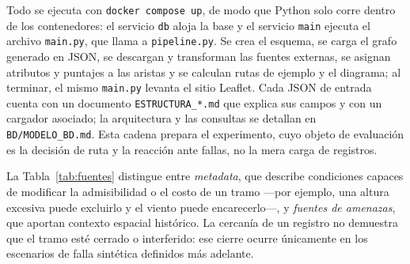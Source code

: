 \documentclass[journal,10pt]{IEEEtran}
\begin{document}
Todo se ejecuta con \texttt{docker compose up}, de modo que Python solo
corre dentro de los contenedores: el servicio \texttt{db} aloja la base y
el servicio \texttt{main} ejecuta el archivo \texttt{main.py}, que llama
a \texttt{pipeline.py}. Se crea el esquema, se carga el grafo generado en
JSON, se descargan y transforman las fuentes externas, se asignan atributos
y puntajes a las aristas y se calculan rutas de ejemplo y el diagrama; al
terminar, el mismo \texttt{main.py} levanta el sitio Leaflet. Cada JSON de entrada cuenta con un documento
\texttt{ESTRUCTURA\_*.md} que explica sus campos y con un cargador
asociado; la arquitectura y las consultas se detallan en
\texttt{BD/MODELO\_BD.md}. Esta cadena prepara el experimento, cuyo objeto
de evaluación es la decisión de ruta y la reacción ante fallas, no la
mera carga de registros.

La Tabla~\ref{tab:fuentes} distingue entre \emph{metadata}, que describe
condiciones capaces de modificar la admisibilidad o el costo de un tramo
---por ejemplo, una altura excesiva puede excluirlo y el viento puede
encarecerlo---, y \emph{fuentes de amenazas}, que aportan contexto espacial
histórico. La cercanía de un registro no demuestra que el tramo esté
cerrado o interferido: ese cierre ocurre únicamente en los escenarios de
falla sintética definidos más adelante.
\end{document}
